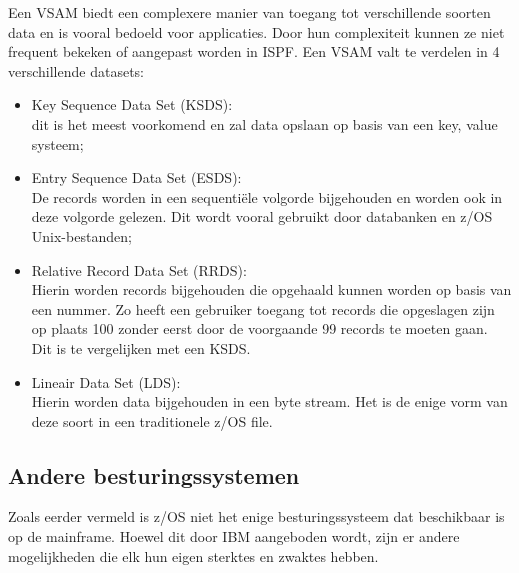 Een VSAM biedt een complexere manier van toegang tot verschillende soorten data en is vooral bedoeld voor applicaties. Door hun complexiteit kunnen ze niet frequent bekeken of aangepast worden in ISPF. Een VSAM valt te verdelen in 4 verschillende datasets:
\begin{itemize}
    \item Key Sequence Data Set (KSDS): \\dit is het meest voorkomend en zal data opslaan op basis van een key, value systeem;
    \item Entry Sequence Data Set (ESDS): \\De records worden in een sequentiële volgorde bijgehouden en worden ook in deze volgorde gelezen. Dit wordt vooral gebruikt door databanken en z/OS Unix-bestanden;
    \item Relative Record Data Set (RRDS): \\Hierin worden records bijgehouden die opgehaald kunnen worden op basis van een nummer. Zo heeft een gebruiker toegang tot records die opgeslagen zijn op plaats 100 zonder eerst door de voorgaande 99 records te moeten gaan. Dit is te vergelijken met een KSDS.
    \item Lineair Data Set (LDS): \\Hierin worden data bijgehouden in een byte stream. Het is de enige vorm van deze soort in een traditionele z/OS file.
\end{itemize}
\autocite{IBM}

\subsection{Andere besturingssystemen}
Zoals eerder vermeld is z/OS niet het enige besturingssysteem dat beschikbaar is op de mainframe. Hoewel dit door IBM aangeboden wordt, zijn er andere mogelijkheden die elk hun eigen sterktes en zwaktes hebben. \\

